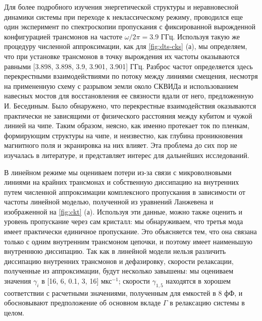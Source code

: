 \documentclass[14pt, a4paper]{extreport}
\numberwithin{equation}{section}
\begin{document}
Для более подробного изучения энергетической структуры и неравновесной динамики системы при переходе к неклассическому режиму, проводился еще один эксперимент по спектроскопии пропускания с фиксированной вырожденной конфигурацией трансмонов на частоте $\omega/2\pi = 3.9$ ГГц. Используя такую же процедуру численной аппроксимации, как для \autoref{fig:dts-cks} (а), мы определяем, что при установке трансмонов в точку вырождения их частоты оказываются равными [3.898, 3.898, 3.9, 3.901, 3.901] ГГц. Разброс частот определяется здесь перекрестными взаимодействиями по потоку между линиями смещения, несмотря на примененную схему с разрывом земли около СКВИДа и использованием навесных мостов для восстановления ее связности вдали от него, предложенную И. Бесединым. Было обнаружено, что перекрестные взаимодействия оказываются практически не зависящими от физического расстояния между кубитом и чужой линией на чипе. Таким образом, неясно, как именно протекает ток по пленкам, формирующим структуры на чипе, и неизвестно, как глубина проникновения магнитного поля и экранировка на них влияет. Эта проблема до сих пор не изучалась в литературе, и представляет интерес для дальнейших исследований.

В линейном режиме мы оцениваем потери из-за связи с микроволновыми линиями на крайних трансмонах и собственную диссипацию на внутренних путем численной аппроксимации комплексного пропускания в зависимости от частоты линейной моделью, полученной из уравнений Ланжевена и изображенной на \autoref{fig:ckt} (а). Используя эти данные, можно также оценить и уровень пропускание через сам кристалл: мы обнаруживаем, что третья мода имеет практически единичное пропускание. Это объясняется тем, что она связана только с одним внутренним трансмоном цепочки, и поэтому имеет наименьшую внутреннюю диссипацию. Так как в линейной модели нельзя различить диссипацию внутренних трансмонов и дефазировку, скорости релаксации, полученные из аппроксимации, будут несколько завышены: мы оцениваем значения $\gamma_i$ в [16, 6, 0.1,  3, 16] $\text{мкс}^{-1}$; скорости $\gamma_{1,5}$ находятся в хорошем соответствии с расчетными значениями, полученным для емкостей в 8 фФ, и обосновывают предположение об основном вкладе $\Gamma$ в релаксацию системы в целом.
\end{document}
